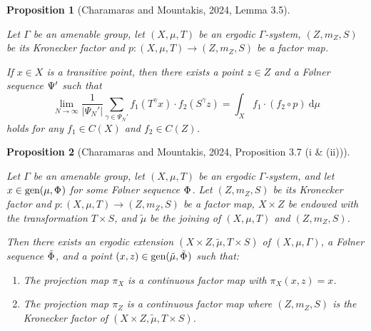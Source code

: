 \documentclass[
  british,
]{article}
\providecommand{\tightlist}{%
  \setlength{\itemsep}{0pt}\setlength{\parskip}{0pt}}
\theoremstyle{plain}
\newtheorem{proposition}{Proposition}[section]
\theoremstyle{definition}
\theoremstyle{plain}
\theoremstyle{remark}
\newcommand{\AmenableGroup}{{\Gamma}}
\newcommand{\AmenableGroupElement}{{\gamma}}
\newcommand{\CountingMeasure}[1]{{\left|#1\right|}}
\newcommand{\Folner}[1][\vphantom{}]{{\Phi}_{#1}}
\newcommand{\FurstenbergFolner}[1][{\vphantom{}}]{{\Psi}_{#1}}
\newcommand{\GroupAction}[2]{T^{#1}{#2}}
\newcommand{\KroneckerAction}[2]{S^{#1}{#2}}
\newcommand{\KroneckerFactorMap}{p}
\newcommand{\KroneckerMeasure}{{m_Z}}
\newcommand{\KroneckerSpace}{{Z}}
\newcommand{\KroneckerSpaceElement}{{z}}
\newcommand{\Measure}{{\mu}}
\newcommand{\ProjectionMap}[1][\vphantom{}]{{\pi}_{#1}}
\newcommand{\ShiftSpace}{{X}}
\newcommand{\ShiftSpaceElement}{{x}}
\newcommand{\FurstenbergSystem}{(\ShiftSpace,\Measure,T)}
\newcommand{\KroneckerFactor}{{(\KroneckerSpace,\KroneckerMeasure,S)}}
\begin{document}
\begin{proposition}[{Charamaras and Mountakis, 2024, Lemma
3.5}]\protect\hypertarget{prp-KroneckerGenericAmenable}{}\label{prp-KroneckerGenericAmenable}

Let \(\AmenableGroup\) be an amenable group, let \(\FurstenbergSystem\)
be an ergodic \(\AmenableGroup\)-system, \(\KroneckerFactor\) be its
Kronecker factor and
\(\KroneckerFactorMap: \FurstenbergSystem\rightarrow\KroneckerFactor\)
be a factor map.

If \(\ShiftSpaceElement\in\ShiftSpace\) is a transitive point, then
there exists a point \(\KroneckerSpaceElement\in\KroneckerSpace\) and a
Følner sequence \(\FurstenbergFolner'\) such that
\[\lim_{N\rightarrow\infty}\frac{1}{\CountingMeasure{\FurstenbergFolner[N]'}}\sum_{\AmenableGroupElement\in\FurstenbergFolner[N]'}f_1(\GroupAction{\AmenableGroupElement}{\ShiftSpaceElement})\cdot f_2(\KroneckerAction{\AmenableGroupElement}{\KroneckerSpaceElement})=\int_\ShiftSpace f_1\cdot(f_2\circ\KroneckerFactorMap)\ \mathrm{d}\mu \]
holds for any \(f_1\in C(\ShiftSpace)\) and
\(f_2\in C(\KroneckerSpace)\).

\end{proposition}

\begin{proposition}[{Charamaras and Mountakis, 2024, Proposition 3.7 (i
\&
(ii))}]\protect\hypertarget{prp-ContinuousKroneckerMap}{}\label{prp-ContinuousKroneckerMap}

Let \(\AmenableGroup\) be an amenable group, let \(\FurstenbergSystem\)
be an ergodic \(\AmenableGroup\)-system, and let
\(\ShiftSpaceElement\in\text{gen}(\Measure,\Folner)\) for some Følner
sequence \(\Folner\). Let \(\KroneckerFactor\) be its Kronecker factor
and
\(\KroneckerFactorMap: \FurstenbergSystem\rightarrow\KroneckerFactor\)
be a factor map, \(\ShiftSpace\times\KroneckerSpace\) be endowed with
the transformation \(T\times S\), and \(\tilde{\Measure}\) be the
joining of \(\FurstenbergSystem\) and \(\KroneckerFactor\).

Then there exists an ergodic extension
\((\ShiftSpace\times\KroneckerSpace, \tilde{\Measure}, T\times S)\) of
\((\ShiftSpace,\Measure,\AmenableGroup)\), a Følner sequence
\(\tilde{\Folner}\), and a point
\((\ShiftSpaceElement,\KroneckerSpaceElement)\in\text{gen}(\tilde{\Measure},\tilde{\Folner})\)
such that:

\begin{enumerate}
\def\labelenumi{\arabic{enumi}.}
\tightlist
\item
  The projection map \(\ProjectionMap[\ShiftSpace]\) is a continuous
  factor map with
  \(\ProjectionMap[\ShiftSpace](\ShiftSpaceElement,\KroneckerSpaceElement)=\ShiftSpaceElement\).
\item
  The projection map \(\ProjectionMap[\KroneckerSpace]\) is a continuous
  factor map where \(\KroneckerFactor\) is the Kronecker factor of
  \((\ShiftSpace\times\KroneckerSpace, \tilde{\Measure}, T\times S)\).
\end{enumerate}

\end{proposition}
\end{document}
